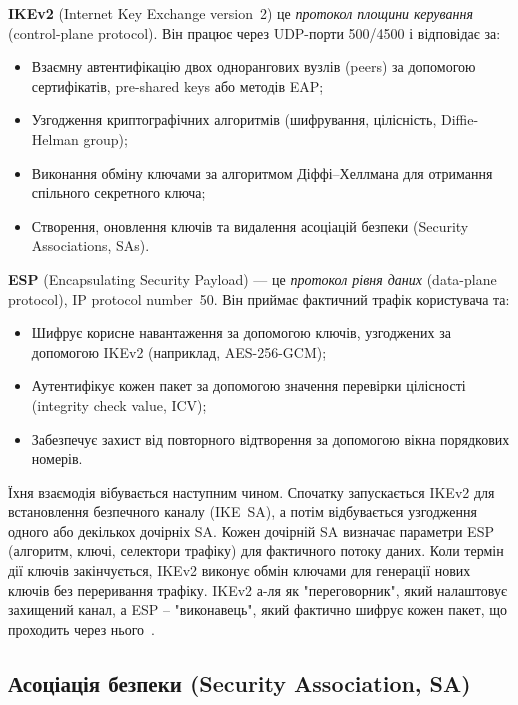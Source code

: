 \textbf{IKEv2} (Internet Key Exchange version~2) це \textit{протокол площини керування} (control-plane protocol). 
Він працює через UDP-порти 500/4500 і відповідає за:
\begin{itemize}
    \item Взаємну автентифікацію двох однорангових вузлів (peers) за допомогою сертифікатів, pre-shared keys або 
        методів EAP;
    \item Узгодження криптографічних алгоритмів (шифрування, цілісність, Diffie-Helman group);
    \item Виконання обміну ключами за алгоритмом Діффі–Хеллмана для отримання спільного секретного ключа;
    \item Створення, оновлення ключів та видалення асоціацій безпеки (Security Associations, SAs).
\end{itemize}

\textbf{ESP} (Encapsulating Security Payload) — це \textit{протокол рівня даних} (data-plane protocol), IP protocol 
number~50. Він приймає фактичний трафік користувача та:
\begin{itemize}
    \item Шифрує корисне навантаження за допомогою ключів, узгоджених за допомогою IKEv2 (наприклад, AES-256-GCM);
    \item Аутентифікує кожен пакет за допомогою значення перевірки цілісності (integrity check value, ICV);
    \item Забезпечує захист від повторного відтворення за допомогою вікна порядкових номерів.
\end{itemize}

Їхня взаємодія вібувається наступним чином. Спочатку запускається IKEv2 для встановлення безпечного каналу (IKE~SA), 
а потім відбувається узгодження одного або декількох дочірніх SA. Кожен дочірній SA визначає параметри ESP 
(алгоритм, ключі, селектори трафіку) для фактичного потоку даних. Коли термін дії ключів закінчується, IKEv2 
виконує обмін ключами для генерації нових ключів без переривання трафіку. IKEv2 а-ля як "переговорник"{}, який 
налаштовує захищений канал, а ESP -- "виконавець"{}, який фактично шифрує кожен пакет, що проходить через 
нього~\cite{rfc6071, nist_sp800_77r1}.

\subsection*{Асоціація безпеки (Security Association, SA)}

